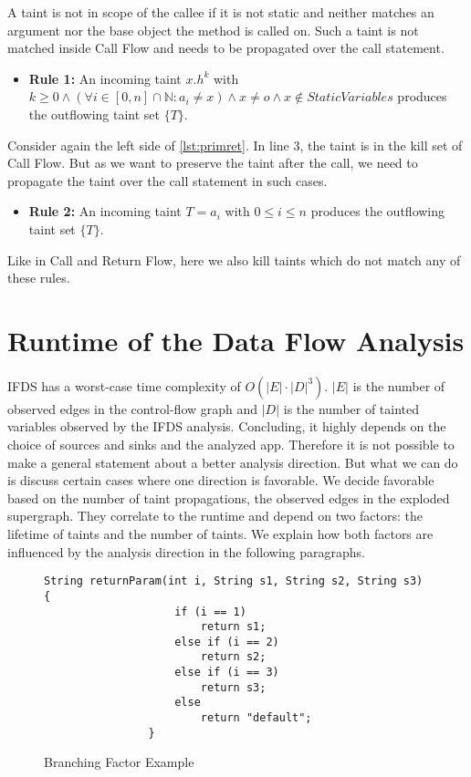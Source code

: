 \documentclass[../draft.tex]{subfiles}
\begin{document}
    A taint is not in scope of the callee if it is not static and neither matches an argument nor the base object the method is called on. Such a taint is not matched inside Call Flow and needs to be propagated over the call statement.
    \begin{itemize}
        \item[] \textbf{Rule 1:} An incoming taint $x.h^k$ with $k \geq 0 \land \left(\forall i \in [0, n] \cap \mathbb{N}: a_i \neq x\right) \land x \neq o \land x \notin \mathit{StaticVariables}$ produces the outflowing taint set $\{T\}$. 
    \end{itemize}

    Consider again the left side of \autoref{lst:primret}. In line 3, the taint is in the kill set of Call Flow. But as we want to preserve the taint after the call, we need to propagate the taint over the call statement in such cases. 
    \begin{itemize}
        \item[] \textbf{Rule 2:} An incoming taint $T = a_i$ with $0 \leq i \leq n$ produces the outflowing taint set $\{T\}$. 
    \end{itemize}
        
    Like in Call and Return Flow, here we also kill taints which do not match any of these rules.
    
    \section{Runtime of the Data Flow Analysis}\label{s:complexity}
    IFDS has a worst-case time complexity of $O(|E| \cdot |D|^3)$. $|E|$ is the number of observed edges in the control-flow graph and $|D|$ is the number of tainted variables observed by the IFDS analysis. Concluding, it highly depends on the choice of sources and sinks and the analyzed app. 
    Therefore it is not possible to make a general statement about a better analysis direction. 
    But what we can do is discuss certain cases where one direction is favorable. We decide favorable based on the number of taint propagations, the observed edges in the exploded supergraph. They correlate to the runtime and depend on two factors: the lifetime of taints and the number of taints. We explain how both factors are influenced by the analysis direction in the following paragraphs.

    \begin{figure}[ht]
        \centering
        \begin{adjustbox}{max width=\textwidth}
            \begin{lstlisting}[gobble=16]
                String returnParam(int i, String s1, String s2, String s3) {
                    if (i == 1)
                        return s1;
                    else if (i == 2)
                        return s2;
                    else if (i == 3)
                        return s3;
                    else
                        return "default";
                }
            \end{lstlisting}    
        \end{adjustbox}
        \caption{Branching Factor Example}
        \label{lst:branching}
    \end{figure}
\end{document}

